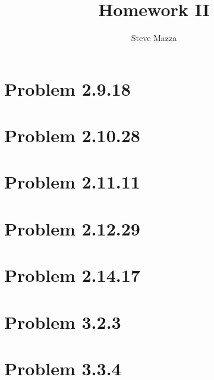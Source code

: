 \documentclass[letterpaper,10pt]{article}
\title{Homework II}
\author{Steve Mazza}
\begin{document}
\maketitle

\section*{Problem 2.9.18}

\section*{Problem 2.10.28}

\section*{Problem 2.11.11}

\section*{Problem 2.12.29}

\section*{Problem 2.14.17}

\section*{Problem 3.2.3}

\section*{Problem 3.3.4}
\end{document}
